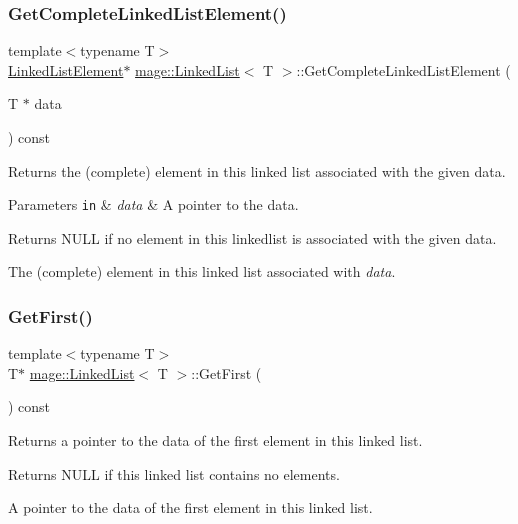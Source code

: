 \subsubsection{\texorpdfstring{Get\+Complete\+Linked\+List\+Element()}{GetCompleteLinkedListElement()}}
{\footnotesize\ttfamily template$<$typename T$>$ \\
\hyperlink{structmage_1_1_linked_list_1_1_linked_list_element}{Linked\+List\+Element}$\ast$ \hyperlink{classmage_1_1_linked_list}{mage\+::\+Linked\+List}$<$ T $>$\+::Get\+Complete\+Linked\+List\+Element (\begin{DoxyParamCaption}\item[{T $\ast$}]{data }\end{DoxyParamCaption}) const}

Returns the (complete) element in this linked list associated with the given data.


\begin{DoxyParams}[1]{Parameters}
\mbox{\tt in}  & {\em data} & A pointer to the data. \\
\hline
\end{DoxyParams}
\begin{DoxyReturn}{Returns}
{\ttfamily N\+U\+LL} if no element in this linkedlist is associated with the given data. 

The (complete) element in this linked list associated with {\itshape data}. 
\end{DoxyReturn}
\hypertarget{classmage_1_1_linked_list_a8394fd1c390b806b9daafdff497b02fb}{}\label{classmage_1_1_linked_list_a8394fd1c390b806b9daafdff497b02fb} 
\subsubsection{\texorpdfstring{Get\+First()}{GetFirst()}}
{\footnotesize\ttfamily template$<$typename T$>$ \\
T$\ast$ \hyperlink{classmage_1_1_linked_list}{mage\+::\+Linked\+List}$<$ T $>$\+::Get\+First (\begin{DoxyParamCaption}{ }\end{DoxyParamCaption}) const}

Returns a pointer to the data of the first element in this linked list.

\begin{DoxyReturn}{Returns}
{\ttfamily N\+U\+LL} if this linked list contains no elements. 

A pointer to the data of the first element in this linked list. 
\end{DoxyReturn}
\hypertarget{classmage_1_1_linked_list_a7e4016d051e44eb5d8a7bde3d193b9e8}{}\label{classmage_1_1_linked_list_a7e4016d051e44eb5d8a7bde3d193b9e8} 

